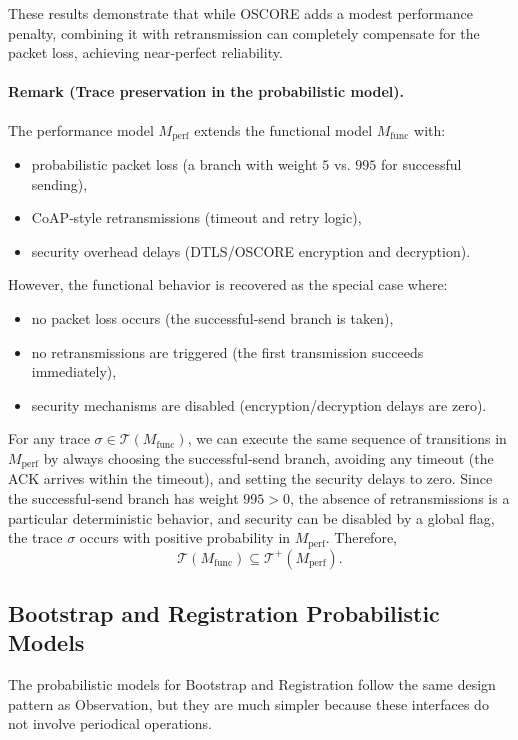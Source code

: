 \documentclass[a4paper,fleqn]{cas-sc}
\begin{document}
These results demonstrate that while OSCORE adds a modest performance penalty, combining it with retransmission can completely compensate for the packet loss, achieving near‑perfect reliability.


\paragraph{Remark (Trace preservation in the probabilistic model).}
The performance model $M_{\text{perf}}$ extends the functional model $M_{\text{func}}$ with:
\begin{itemize}
    \item probabilistic packet loss (a branch with weight $5$ vs. $995$ for successful sending),
    \item CoAP‑style retransmissions (timeout and retry logic),
    \item security overhead delays (DTLS/OSCORE encryption and decryption).
\end{itemize}
However, the functional behavior is recovered as the special case where:
\begin{itemize}
    \item no packet loss occurs (the successful‑send branch is taken),
    \item no retransmissions are triggered (the first transmission succeeds immediately),
    \item security mechanisms are disabled (encryption/decryption delays are zero).
\end{itemize}
For any trace $\sigma \in \mathcal{T}(M_{\text{func}})$, we can execute the same sequence of transitions in $M_{\text{perf}}$ by always choosing the successful‑send branch, avoiding any timeout (the ACK arrives within the timeout), and setting the security delays to zero. Since the successful‑send branch has weight $995 > 0$, the absence of retransmissions is a particular deterministic behavior, and security can be disabled by a global flag, the trace $\sigma$ occurs with positive probability in $M_{\text{perf}}$. Therefore,
\[
\mathcal{T}(M_{\text{func}}) \subseteq \mathcal{T}^+(M_{\text{perf}}).
\]

\subsection{Bootstrap and Registration Probabilistic Models}
The probabilistic models for Bootstrap and Registration follow the same design pattern as Observation, but they are much simpler because these interfaces do not involve periodical operations. 
\end{document}
